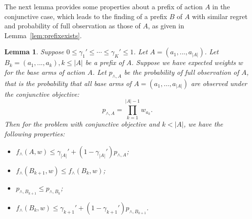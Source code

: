 \documentclass{article}
\newcommand{\abs}[1]{\left| #1 \right|}
\newtheorem{lemma}[theorem]{Lemma}%
\begin{document}
The next lemma provides some properties about a prefix of action $A$
	in the conjunctive case, 
	which leads to the finding of a prefix $B$ of $A$ with similar regret
	and probability of full observation as those of $A$, as given
	in Lemma~\ref{lem:prefixexists}.
\begin{lemma}
\label{lem:prefixRelation}
Suppose 
$0 \leq \gamma_1' \leq \cdots \leq \gamma_K' \leq 1$. Let $A = (a_1, ..., a_{\abs{A}})$. 
Let $B_k = (a_1, ..., a_k), k \leq \abs{A}$ be a prefix of $A$. 
Suppose we have expected weights $w$ for the base arms of action $A$. 
Let $p_{\wedge, A}$ be the {\em probability of full observation of $A$}, that is the probability that all base arms of $A = (a_1, \ldots, a_{\abs{A}})$ are observed under the conjunctive objective:
$$
p_{\wedge, A} = \prod_{k=1}^{\abs{A}-1} w_{a_k}.
$$
Then for the problem with conjunctive objective and $k < \abs{A}$, we have the following properties:
\begin{itemize}
\item[(1)] $f_{\wedge}(A, w) \leq \gamma_{\abs{A}}' + (1 - \gamma_{\abs{A}}') p_{\wedge, A}$;
\item[(2)] $f_{\wedge}(B_{k+1}, w) \leq f_{\wedge}(B_k, w)$;
\item[(3)] $p_{\wedge, B_{k+1}} \leq p_{\wedge, B_k}$;
\item[(4)] $f_{\wedge}(B_k, w) \leq \gamma_{k+1}' + (1 - \gamma_{k+1}') p_{\wedge,B_{k+1}}$.
\end{itemize}
\end{lemma}
\end{document}
